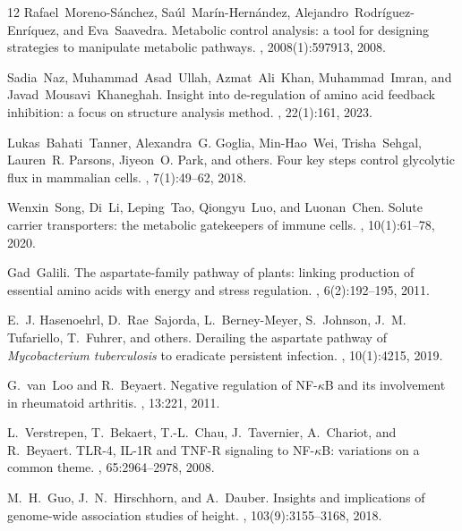 \documentclass[unnumsec,webpdf,contemporary,large]{oup-authoring-template}%
\theoremstyle{thmstyleone}%
\theoremstyle{thmstyletwo}%
\theoremstyle{thmstylethree}%
\begin{document}
\begin{thebibliography}{12}
Rafael~Moreno-S\'anchez, Sa\'ul~Mar\'in-Hern\'andez, Alejandro~Rodr\'iguez-Enr\'iquez, and Eva~Saavedra.
\newblock Metabolic control analysis: a tool for designing strategies to manipulate metabolic pathways.
, 2008(1):597913, 2008.

Sadia~Naz, Muhammad~Asad~Ullah, Azmat~Ali~Khan, Muhammad~Imran, and Javad~Mousavi~Khaneghah.
\newblock Insight into de-regulation of amino acid feedback inhibition: a focus on structure analysis method.
, 22(1):161, 2023.

Lukas~Bahati~Tanner, Alexandra~G. Goglia, Min-Hao~Wei, Trisha~Sehgal, Lauren~R. Parsons, Jiyeon~O. Park, and others.
\newblock Four key steps control glycolytic flux in mammalian cells.
, 7(1):49--62, 2018.

Wenxin~Song, Di~Li, Leping~Tao, Qiongyu~Luo, and Luonan~Chen.
\newblock Solute carrier transporters: the metabolic gatekeepers of immune cells.
, 10(1):61--78, 2020.

Gad~Galili.
\newblock The aspartate-family pathway of plants: linking production of essential amino acids with energy and stress regulation.
, 6(2):192--195, 2011.

E.~J. Hasenoehrl, D.~Rae~Sajorda, L.~Berney-Meyer, S.~Johnson, J.~M. Tufariello, T.~Fuhrer, and others.
\newblock Derailing the aspartate pathway of \textit{Mycobacterium tuberculosis} to eradicate persistent infection.
, 10(1):4215, 2019.

G.~van~Loo and R.~Beyaert.
\newblock Negative regulation of NF-$\kappa$B and its involvement in rheumatoid arthritis.
, 13:221, 2011.

L.~Verstrepen, T.~Bekaert, T.-L.~Chau, J.~Tavernier, A.~Chariot, and R.~Beyaert.
\newblock TLR-4, IL-1R and TNF-R signaling to NF-$\kappa$B: variations on a common theme.
, 65:2964--2978, 2008.

M.~H.~Guo, J.~N.~Hirschhorn, and A.~Dauber.
\newblock Insights and implications of genome-wide association studies of height.
, 103(9):3155--3168, 2018.


\end{thebibliography}
\end{document}
